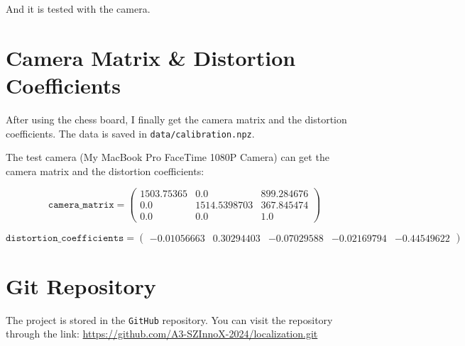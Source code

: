 \documentclass{article}
\begin{document}
And it is tested with the camera.

\section{Camera Matrix \& Distortion Coefficients}

After using the chess board, I finally get the camera matrix and the distortion coefficients. The data is saved in \texttt{data/calibration.npz}.

The test camera (My MacBook Pro FaceTime 1080P Camera) can get the camera matrix and the distortion coefficients:

\[
  \texttt{camera\_matrix}=\left(\begin{matrix}
    1503.75365 & 0.0 & 899.284676 \\
    0.0 & 1514.5398703 & 367.845474 \\
    0.0 & 0.0 & 1.0
  \end{matrix}\right)
\]

\[
  \texttt{distortion\_coefficients}=\left(\begin{matrix}
    -0.01056663 & 0.30294403 & -0.07029588 & -0.02169794 & -0.44549622
  \end{matrix}\right)
\]

\section{Git Repository}

The project is stored in the \texttt{GitHub} repository. You can visit the repository through the link: \url{
    https://github.com/A3-SZInnoX-2024/localization.git
}
\end{document}
